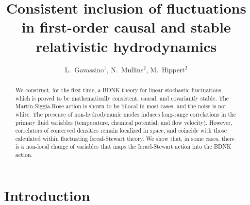 \documentclass[a4paper, amsfonts, amssymb, amsmath, reprint, showkeys, nofootinbib, twoside,notitlepage,onecolumn]{revtex4-2}
\theoremstyle{definition}
\begin{document}
\title{Consistent inclusion of fluctuations in first-order causal and stable relativistic hydrodynamics}
\author{ L.~Gavassino$^1$, N.~Mullins$^2$, M.~Hippert$^2$ }


\begin{abstract}
We construct, for the first time, a BDNK theory for linear stochastic fluctuations, which is proved to be mathematically consistent, causal, and covariantly stable. The Martin-Siggia-Rose action is shown to be bilocal in most cases, and the noise is not white. The presence of non-hydrodynamic modes induces long-range correlations in the primary fluid variables (temperature, chemical potential, and flow velocity). However, correlators of conserved densities remain localized in space, and coincide with those calculated within fluctuating Isreal-Stewart theory. We show that, in some cases, there is a non-local change of variables that maps the Israel-Stewart action into the BDNK action.
\end{abstract} 



\maketitle

\section{Introduction}
\end{document}
